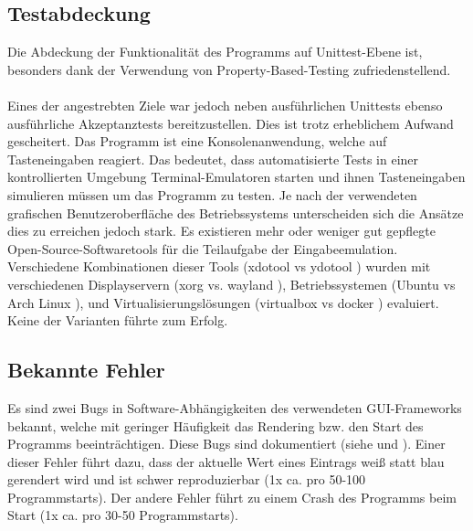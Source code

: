 \subsection{Testabdeckung} \label{Testabdeckung}
Die Abdeckung der Funktionalität des Programms auf Unittest-Ebene ist, besonders
dank der Verwendung von \gls{Property-Based-Testing} \cite{property-based-testing}
zufriedenstellend.

\paragraph{}
Eines der angestrebten Ziele war jedoch neben ausführlichen Unittests ebenso ausführliche
Akzeptanztests bereitzustellen. Dies ist trotz erheblichem Aufwand gescheitert.
Das Programm ist eine Konsolenanwendung, welche auf Tasteneingaben reagiert. Das
bedeutet, dass automatisierte Tests in einer kontrollierten Umgebung Terminal-Emulatoren
starten und ihnen Tasteneingaben simulieren müssen um das Programm zu testen. Je nach
der verwendeten grafischen Benutzeroberfläche des Betriebssystems unterscheiden sich
die Ansätze dies zu erreichen jedoch stark. Es existieren mehr oder weniger gut
gepflegte Open-Source-Softwaretools für die Teilaufgabe der Eingabeemulation. Verschiedene
Kombinationen dieser Tools (xdotool \cite{xdotool} vs ydotool \cite{ydotool}) wurden
mit verschiedenen Displayservern (xorg \cite{xorg} vs. wayland \cite{wayland}),
Betriebssystemen (Ubuntu \cite{ubuntu} vs Arch Linux \cite{arch}), und
Virtualisierungslösungen (virtualbox \cite{virtualbox} vs docker \cite{docker})
evaluiert. Keine der Varianten führte zum Erfolg.

\subsection{Bekannte Fehler}
Es sind zwei Bugs in Software-Abhängigkeiten des verwendeten \gls{GUI}-Frameworks
bekannt, welche mit geringer Häufigkeit das \gls{Rendering} bzw. den Start des Programms
beeinträchtigen. Diese Bugs sind dokumentiert (siehe \cite{bug-vty-startup-crash} und
\cite{bug-vty-terminal-capabilities}). Einer dieser Fehler führt dazu, dass der
aktuelle Wert eines Eintrags weiß statt blau gerendert wird und ist schwer
reproduzierbar (1x ca. pro 50-100 Programmstarts). Der andere Fehler führt zu
einem Crash des Programms beim Start (1x ca. pro 30-50 Programmstarts).
